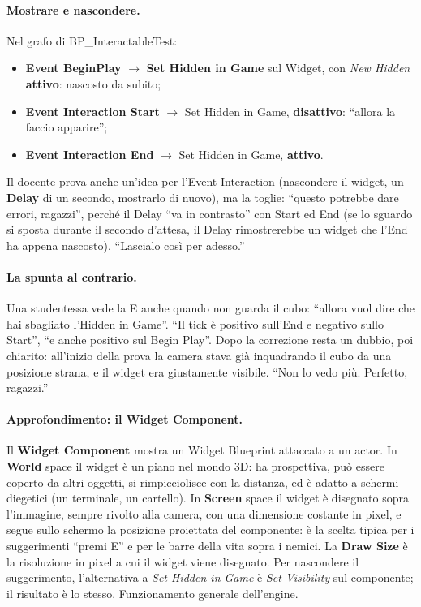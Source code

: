 \paragraph{Mostrare e nascondere.} Nel grafo di BP\_InteractableTest:
\begin{itemize}
  \item \textbf{Event BeginPlay} $\rightarrow$ \textbf{Set Hidden in Game} sul Widget, con
        \emph{New Hidden} \textbf{attivo}: nascosto da subito;
  \item \textbf{Event Interaction Start} $\rightarrow$ Set Hidden in Game,
        \textbf{disattivo}: ``allora la faccio apparire'';
  \item \textbf{Event Interaction End} $\rightarrow$ Set Hidden in Game, \textbf{attivo}.
\end{itemize}
Il docente prova anche un'idea per l'Event Interaction (nascondere il widget, un
\textbf{Delay} di un secondo, mostrarlo di nuovo), ma la toglie: ``questo potrebbe dare
errori, ragazzi'', perché il Delay ``va in contrasto'' con Start ed End (se lo sguardo si
sposta durante il secondo d'attesa, il Delay rimostrerebbe un widget che l'End ha appena
nascosto). ``Lascialo così per adesso.''

\paragraph{La spunta al contrario.} Una studentessa vede la E anche quando non guarda il
cubo: ``allora vuol dire che hai sbagliato l'Hidden in Game''. ``Il tick è positivo sull'End
e negativo sullo Start'', ``e anche positivo sul Begin Play''. Dopo la correzione resta un
dubbio, poi chiarito: all'inizio della prova la camera stava già inquadrando il cubo da una
posizione strana, e il widget era giustamente visibile. ``Non lo vedo più. Perfetto,
ragazzi.''

\paragraph{Approfondimento: il Widget Component.} Il \textbf{Widget Component} mostra un
Widget Blueprint attaccato a un actor. In \textbf{World} space il widget è un piano nel
mondo 3D: ha prospettiva, può essere coperto da altri oggetti, si rimpicciolisce con la
distanza, ed è adatto a schermi diegetici (un terminale, un cartello). In \textbf{Screen}
space il widget è disegnato sopra l'immagine, sempre rivolto alla camera, con una dimensione
costante in pixel, e segue sullo schermo la posizione proiettata del componente: è la scelta
tipica per i suggerimenti ``premi E'' e per le barre della vita sopra i nemici. La
\textbf{Draw Size} è la risoluzione in pixel a cui il widget viene disegnato. Per nascondere
il suggerimento, l'alternativa a \emph{Set Hidden in Game} è \emph{Set Visibility} sul
componente; il risultato è lo stesso. Funzionamento generale dell'engine.

